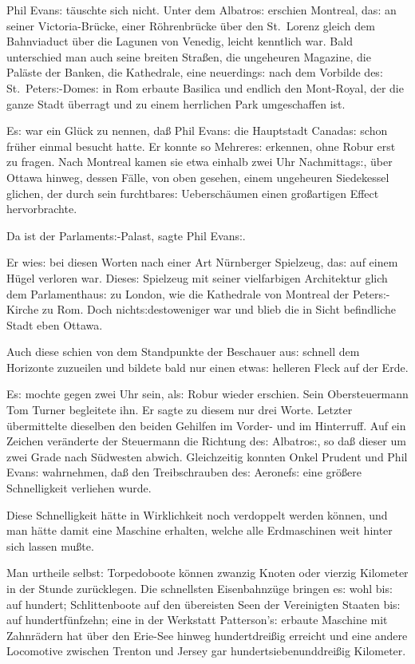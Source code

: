 \documentclass[oneside,12pt]{book}
\newcommand{\s}{s:}
\begin{document}
Phil Evan{\s} t\"auschte sich nicht. Unter dem {\glqq}Albatro{\s}{\grqq}
erschien Montreal, da{\s} an seiner Victoria-Br\"ucke, einer
R\"ohrenbr\"ucke \"uber den St.~Lorenz gleich dem Bahnviaduct \"uber
die Lagunen von Venedig, leicht kenntlich war. Bald unterschied man
auch seine breiten Stra{\ss}en, die ungeheuren Magazine, die
Pal\"aste der Banken, die Kathedrale, eine neuerding{\s} nach dem
Vorbilde de{\s} St.~Peter{\s}-Dome{\s} in Rom erbaute Basilica und
endlich den Mont-Royal, der die ganze Stadt \"uberragt und zu einem
herrlichen Park umgeschaffen ist.

E{\s} war ein Gl\"uck zu nennen, da{\ss} Phil Evan{\s} die Hauptstadt
Canada{\s} schon fr\"uher einmal besucht hatte. Er konnte so
Mehrere{\s} erkennen, ohne Robur erst zu fragen. Nach Montreal kamen
sie etwa einhalb zwei Uhr Nachmittag{\s}, \"uber Ottawa hinweg,
dessen F\"alle, von oben gesehen, einem ungeheuren Siedekessel
glichen, der durch sein furchtbare{\s} Uebersch\"aumen einen
gro{\ss}artigen Effect hervorbrachte.

{\glqq}Da ist der Parlament{\s}-Palast,{\grqq} sagte Phil Evan{\s}.

Er wie{\s} bei diesen Worten nach einer Art N\"urnberger Spielzeug,
da{\s} auf einem H\"ugel verloren war. Diese{\s} Spielzeug mit seiner
vielfarbigen Architektur glich dem Parlamenthau{\s} zu London, wie
die Kathedrale von Montreal der Peter{\s}-Kirche zu Rom. Doch
nicht{\s}destoweniger war und blieb die in Sicht befindliche Stadt
eben Ottawa.

Auch diese schien von dem Standpunkte der Beschauer au{\s} schnell
dem Horizonte zuzueilen und bildete bald nur einen etwa{\s} helleren
Fleck auf der Erde.

E{\s} mochte gegen zwei Uhr sein, al{\s} Robur wieder erschien. Sein
Obersteuermann Tom Turner begleitete ihn. Er sagte zu diesem nur drei
Worte. Letzter \"ubermittelte dieselben den beiden Gehilfen im
Vorder- und im Hinterruff. Auf ein Zeichen ver\"anderte der
Steuermann die Richtung de{\s} {\glqq}Albatro{\s}{\grqq}, so da{\ss}
dieser um zwei Grade nach S\"udwesten abwich. Gleichzeitig konnten
Onkel Prudent und Phil Evan{\s} wahrnehmen, da{\ss} den
Treibschrauben de{\s} Aeronef{\s} eine gr\"o{\ss}ere Schnelligkeit
verliehen wurde.

Diese Schnelligkeit h\"atte in Wirklichkeit noch verdoppelt werden
k\"onnen, und man h\"atte damit eine Maschine erhalten, welche alle
Erdmaschinen weit hinter sich lassen mu{\ss}te.

Man urtheile selbst: Torpedoboote k\"onnen zwanzig Knoten oder
vierzig Kilometer in der Stunde zur\"ucklegen. Die schnellsten
Eisenbahnz\"uge bringen e{\s} wohl bi{\s} auf hundert; Schlittenboote
auf den \"ubereisten Seen der Vereinigten Staaten bi{\s} auf
hundertf\"unfzehn; eine in der Werkstatt Patterson'{\s} erbaute
Maschine mit Zahnr\"adern hat \"uber den Erie-See hinweg
hundertdrei{\ss}ig erreicht und eine andere Locomotive zwischen
Trenton und Jersey gar hundertsiebenunddrei{\ss}ig Kilometer.
\end{document}
